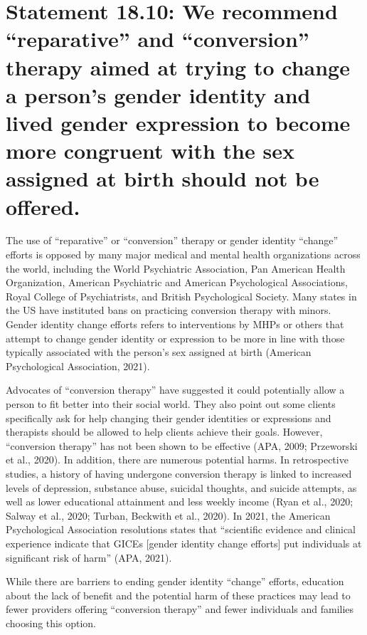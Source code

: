 \documentclass[
]{book}
\begin{document}
\hypertarget{statement-18.10-we-recommend-reparative-and-conversion-therapy-aimed-at-trying-to-change-a-persons-gender-identity-and-lived-gender-expression-to-become-more-congruent-with-the-sex-assigned-at-birth-should-not-be-offered.}{%
\section*{Statement 18.10: We recommend ``reparative'' and ``conversion'' therapy aimed at trying to change a person's gender identity and lived gender expression to become more congruent with the sex assigned at birth should not be offered.}\label{statement-18.10-we-recommend-reparative-and-conversion-therapy-aimed-at-trying-to-change-a-persons-gender-identity-and-lived-gender-expression-to-become-more-congruent-with-the-sex-assigned-at-birth-should-not-be-offered.}}

The use of ``reparative'' or ``conversion'' therapy
or gender identity ``change'' efforts is opposed
by many major medical and mental health organizations across the world, including the World
Psychiatric Association, Pan American Health
Organization, American Psychiatric and American
Psychological Associations, Royal College of
Psychiatrists, and British Psychological Society.
Many states in the US have instituted bans on
practicing conversion therapy with minors.
Gender identity change efforts refers to interventions by MHPs or others that attempt to
change gender identity or expression to be more
in line with those typically associated with the
person's sex assigned at birth (American
Psychological Association, 2021).

Advocates of ``conversion therapy'' have suggested it could potentially allow a person to fit
better into their social world. They also point
out some clients specifically ask for help changing
their gender identities or expressions and therapists should be allowed to help clients achieve
their goals. However, ``conversion therapy'' has
not been shown to be effective (APA, 2009;
Przeworski et al., 2020). In addition, there are
numerous potential harms. In retrospective studies, a history of having undergone conversion
therapy is linked to increased levels of depression,
substance abuse, suicidal thoughts, and suicide
attempts, as well as lower educational attainment
and less weekly income (Ryan et al., 2020; Salway
et al., 2020; Turban, Beckwith et al., 2020). In
2021, the American Psychological Association
resolutions states that ``scientific evidence and
clinical experience indicate that GICEs {[}gender
identity change efforts{]} put individuals at significant risk of harm'' (APA, 2021).

While there are barriers to ending gender identity ``change'' efforts, education about the lack of
benefit and the potential harm of these practices
may lead to fewer providers offering ``conversion
therapy'' and fewer individuals and families
choosing this option.

  
\end{document}
